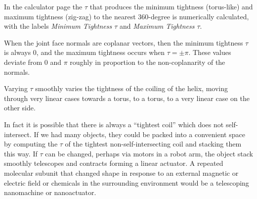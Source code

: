 \documentclass{svproc}
\begin{document}
In the calculator page
the $\tau$ that produces the minimum tightness (torus-like) and maximum tightness (zig-zag) to the
nearest 360-degree is numerically calculated,
with the labels {\em Minimum Tightness $\tau$} and {\em Maximum Tightness $\tau$}.

When the joint face normals are coplanar vectors, then the minimum tightness $\tau$ is
always $0$, and the maximum tightness occurs when $\tau = \pm \pi$.
These values deviate from $0$ and $\pi$ roughly in proportion
to the non-coplanarity of the normals.

Varying $\tau$ smoothly varies the tightness of the coiling of the helix,
moving through very linear cases towards a torus,
to a torus, to a very linear case on the other side.

In fact it is possible that there is always a ``tightest coil''
which does not self-intersect. If we had many objects,
they could be packed into a convenient space by computing the $\tau$
of the tightest non-self-intersecting coil and stacking them this way.
If $\tau$ can be changed, perhaps via motors in a robot arm,
the object stack smoothly telescopes and contracts forming a
linear actuator.
A repeated molecular subunit that changed shape in
response to an external magnetic or electric field or chemicals in the surrounding
environment would be a telescoping nanomachine or nanoactuator.
\end{document}
